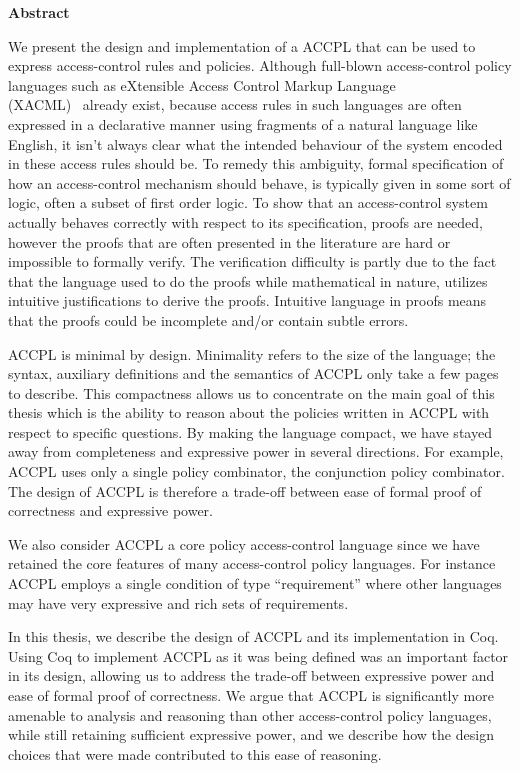 
\begin{center}\textbf{Abstract}\end{center}

We present the design and implementation of a \ac{ACCPL} that can be used to express access-control rules and policies. Although full-blown access-control policy languages such as eXtensible Access Control Markup Language \\(XACML)~\cite{xacml} already exist, because access rules in such languages are often expressed in a declarative manner using fragments of a natural language like English, it isn't always clear what the intended behaviour of the system encoded in these access rules should be. To remedy this ambiguity, formal specification of how an access-control mechanism should behave, is typically given in some sort of logic, often a subset of first order logic. To show that an access-control system actually behaves correctly with respect to its specification, proofs are needed, however the proofs that are often presented in the literature are hard or impossible to formally verify. The verification difficulty is partly due to the fact that the language used to do the proofs while mathematical in nature, utilizes intuitive justifications to derive the proofs. Intuitive language in proofs means that the proofs could be incomplete and/or contain subtle errors.

\ac{ACCPL} is minimal by design. Minimality refers to the size of the language; the syntax, auxiliary definitions and the semantics of \ac{ACCPL} only take a few pages to describe. This compactness allows us to concentrate on the main goal of this thesis which is the ability to reason about the policies written in \ac{ACCPL} with respect to specific questions. By making the language compact, we have stayed away from completeness and expressive power in several directions. For example, \ac{ACCPL} uses only a single policy combinator, the conjunction policy combinator. The design of \ac{ACCPL} is therefore a trade-off between ease of formal proof of correctness and expressive power.

We also consider \ac{ACCPL} a core policy access-control language since we have retained the core features of many access-control policy languages. For instance \ac{ACCPL} employs a single condition of type ``requirement'' where other languages may have very expressive and rich sets of requirements. 

In this thesis, we describe the design of ACCPL and its implementation in Coq.  Using Coq to implement ACCPL as it was being defined was an important factor in its design, allowing us to address the trade-off between expressive power and ease of formal proof of correctness. We argue that \ac{ACCPL} is significantly more amenable to analysis and reasoning than other access-control policy languages, while still retaining sufficient expressive power, and we describe how the design choices that were made contributed to this ease of reasoning. 

